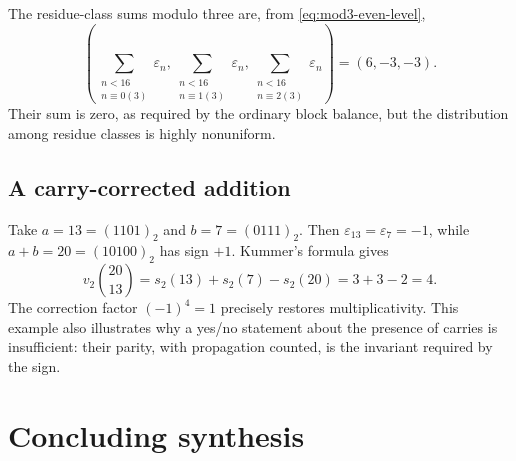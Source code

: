 \documentclass[11pt,oneside]{article}
\theoremstyle{definition}
\theoremstyle{remark}
\newcommand{\wt}{s_2}
\newcommand{\vtwo}{v_2}
\newcommand{\eps}{\varepsilon}
\begin{document}
The residue-class sums modulo three are, from \eqref{eq:mod3-even-level},
\begin{equation}
  \left(
  \sum_{\substack{n<16\\n\equiv0(3)}}\eps_n,
  \sum_{\substack{n<16\\n\equiv1(3)}}\eps_n,
  \sum_{\substack{n<16\\n\equiv2(3)}}\eps_n
  \right)=(6,-3,-3).                                      \label{eq:P4-rarefied}
\end{equation}
Their sum is zero, as required by the ordinary block balance, but the distribution among
residue classes is highly nonuniform.

\subsection{A carry-corrected addition}

Take \(a=13=(1101)_2\) and \(b=7=(0111)_2\).  Then
\(\eps_{13}=\eps_7=-1\), while \(a+b=20=(10100)_2\) has sign \(+1\).  Kummer's formula gives
\begin{equation}
  \vtwo\binom{20}{13}=\wt(13)+\wt(7)-\wt(20)=3+3-2=4.      \label{eq:carry-example}
\end{equation}
The correction factor \((-1)^4=1\) precisely restores multiplicativity.  This example also
illustrates why a yes/no statement about the presence of carries is insufficient: their
parity, with propagation counted, is the invariant required by the sign.

\section{Concluding synthesis}
\label{sec:conclusion}
\end{document}
